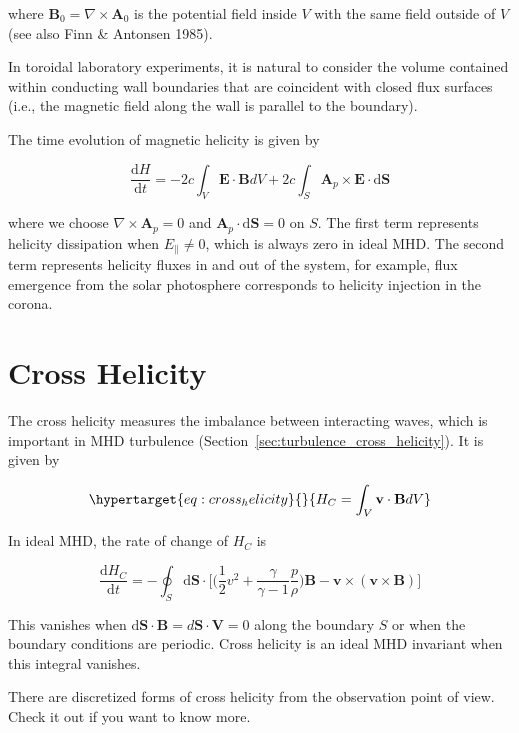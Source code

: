 \documentclass[
  notoc %
]{tufte-book}
\begin{document}
where \(\mathbf{B}_0=\nabla\times\mathbf{A}_0\) is the potential field
inside \(V\) with the same field outside of \(V\) (see also Finn \&
Antonsen 1985).

In toroidal laboratory experiments, it is natural to consider the volume
contained within conducting wall boundaries that are coincident with
closed flux surfaces (i.e., the magnetic field along the wall is
parallel to the boundary).

The time evolution of magnetic helicity is given by

\[
\frac{\mathrm{d}H}{\mathrm{d}t} = -2c\int_V \mathbf{E}\cdot\mathbf{B}dV + 2c\int_S \mathbf{A}_p\times\mathbf{E}\cdot \mathrm{d}\mathbf{S}
\]

where we choose \(\nabla\times\mathbf{A}_p=0\) and
\(\mathbf{A}_p\cdot \mathrm{d}\mathbf{S}=0\) on \(S\). The first term
represents helicity dissipation when \(E_\parallel\neq 0\), which is
always zero in ideal MHD. The second term represents helicity fluxes in
and out of the system, for example, flux emergence from the solar
photosphere corresponds to helicity injection in the corona.

\hypertarget{sec:cross_helicity}{%
\section{Cross Helicity}\label{sec:cross_helicity}}

The cross helicity measures the imbalance between interacting waves,
which is important in MHD turbulence
(Section~\ref{sec:turbulence_cross_helicity}). It is given by

\begin{equation}\protect\hypertarget{eq:cross_helicity}{}{
H_C = \int_V \mathbf{v}\cdot\mathbf{B} dV
}\label{eq:cross_helicity}\end{equation}

In ideal MHD, the rate of change of \(H_C\) is

\[
\frac{\mathrm{d}H_C}{\mathrm{d}t} = -\oint_S \mathrm{d}\mathbf{S}\cdot \Big[ \Big(\frac{1}{2}v^2 + \frac{\gamma}{\gamma-1} \frac{p}{\rho}\Big)\mathbf{B} - \mathbf{v}\times(\mathbf{v}\times\mathbf{B}) \Big]
\]

This vanishes when
\(\mathrm{d}\mathbf{S}\cdot\mathbf{B} = d\mathbf{S}\cdot\mathbf{V}=0\)
along the boundary \(S\) or when the boundary conditions are periodic.
Cross helicity is an ideal MHD invariant when this integral vanishes.

There are discretized forms of cross helicity from the observation point
of view. Check it out if you want to know more.
\end{document}
